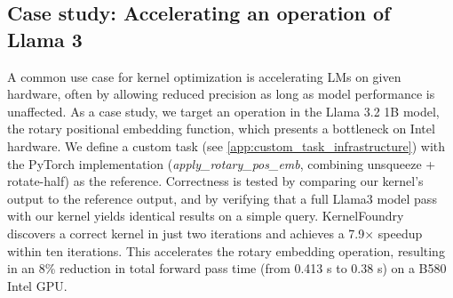 \subsection{Case study: Accelerating an operation of Llama 3}
A common use case for kernel optimization is accelerating LMs on given hardware, often by allowing reduced precision as long as model performance is unaffected. As a case study, we target an operation in the Llama 3.2 1B model, the rotary positional embedding function, which presents a bottleneck on Intel hardware. We define a custom task (see \autoref{app:custom_task_infrastructure}) with the PyTorch implementation (\emph{apply\_rotary\_pos\_emb}, combining unsqueeze + rotate-half) as the reference. Correctness is tested by comparing our kernel’s output to the reference output, and by verifying that a full Llama3 model pass with our kernel yields identical results on a simple query. KernelFoundry discovers a correct kernel in just two iterations and achieves a 7.9× speedup within ten iterations. This accelerates the rotary embedding operation, resulting in an 8\% reduction in total forward pass time (from 0.413 s to 0.38 s) on a B580 Intel GPU.

